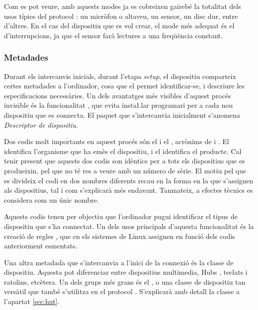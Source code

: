 

Com es pot veure, amb aquests modes ja es cobreixen gairebé la totalitat dels
usos típics del protocol : un micròfon o altaveu, un sensor, un
disc dur, entre d'altres. En el cas del dispositiu que es vol crear, el mode més
adequat és el d'interrupcions, ja que el sensor farà lectures a una freqüència
constant.

\subsubsection*{Metadades}
\label{subsubsec:metadades}

Durant els intercanvis inicials, durant l'etapa \emph{setup}, el dispositiu
comparteix certes metadades a l'ordinador, cosa que el permet identificar-se,
i descriure les especificacions necessàries. Un dels avantatges més visibles
d'aquest procés invisible és la funcionalitat , que evita
insta\l.lar programari per a cada nou dispositiu que es connecta. El paquet
que s'intercanvia inicialment s'anomena \emph{Descriptor de dispositiu}.

Dos codis molt importants en aquest procés són el  i el ,
acrònims de  i . El  identifica
l'organisme que ha emès el dispositiu, i el  identifica el producte.
Cal tenir present que aquests dos codis son idèntics per a tots els dispositius
que es produeixin, pel que no té res a veure amb un número de sèrie. El motiu
pel que es divideix el codi en dos nombres diferents recau en la forma en la
que s'assignen als dispositius, tal i com s'explicarà més endavant. Tanmateix,
a efectes tècnics es considera com un únic nombre.

Aquests codis tenen per objectiu que l'ordinador pugui identificar el tipus de
dispositiu que s'ha connectat. Un dels usos principals d'aquesta funcionalitat
és la creació de regles , que en els sistemes de Linux assignen
 en funció dels codis anteriorment esmentats.

Una altra metadada que s'intercanvia a l'inici de la connexió és la classe
de dispositiu. Aquesta pot diferenciar entre dispositius multimedia, Hubs
, teclats i ratolins, etcètera. Un dels grups més grans és el
, o  una classe de dispositiu tan
versàtil que també s'utilitza en el protocol . S'explicarà amb
detall la classe  a l'apartat \ref{sec:hut}.

